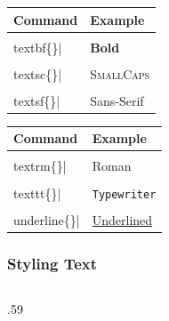 \begin{frame}
\begin{center}
\begin{tabular}{@{}l l@{}}
    \end{tabular}%
    \quad%
    \begin{tabular}{@{}l l@{}}
        \textbf{Command}
        & \textbf{Example}\\
    \toprule[1.2pt]
        \lstinline|\\textbf\{\}|          
        & \textbf{Bold}\\
    \midrule
        \lstinline|\\textsc\{\}|       
        & \textsc{SmallCaps}\\
    \midrule
        \lstinline|\\textsf\{\}|       
        & \textsf{Sans-Serif}\\
    \end{tabular}%
    \quad%
    \begin{tabular}{@{}l l@{}}
        \textbf{Command}
        & \textbf{Example}\\
    \toprule[1.2pt]
        \lstinline|\\textrm\{\}|       
        & \textrm{Roman}\\
    \midrule
        \lstinline|\\texttt\{\}|       
        & \texttt{Typewriter}\\
    \midrule
        \lstinline|\\underline\{\}|       
        & \underline{Underlined}\\
    \end{tabular}
    
    \end{center}
\end{frame}

\begin{frame}
    \frametitle{Styling Text}
    \begin{columns}
        \begin{column}{.59\textwidth}
            {}
        \end{column}
    \end{columns}
\end{frame}